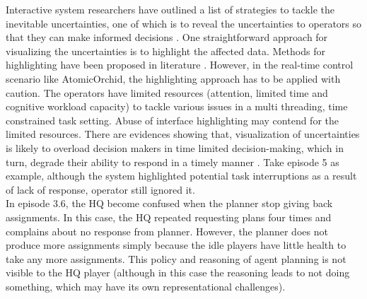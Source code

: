 Interactive system researchers have outlined a list of strategies to tackle the inevitable uncertainties, one of which is to reveal the uncertainties to operators so that they can make informed decisions \cite{Benford2006} \cite{Skeels2008}. One straightforward approach for visualizing the uncertainties is to highlight the affected data. Methods for highlighting have been proposed in literature \cite{Conti2006}. However, in the real-time control scenario like AtomicOrchid, the highlighting approach has to be applied with caution.  The operators have limited resources (attention, limited time and cognitive workload capacity) to tackle various issues in a multi threading, time constrained task setting. Abuse of interface highlighting may contend for the limited resources. There are evidences showing that, visualization of uncertainties is likely to overload decision makers in time limited decision-making, which in turn, degrade their ability to respond in a timely manner \cite{Zuk2007}. Take episode 5 as example, although the system highlighted potential task interruptions as a result of lack of response, operator still ignored it. \\

In episode 3.6, the HQ  become confused when the planner stop giving back assignments. In this case, the HQ repeated requesting plans four times and complains about no response from planner. However, the planner does not produce more assignments simply because the idle players have little health to take any more assignments. This policy and reasoning of agent planning is not visible to the HQ player (although in this case the reasoning leads to not doing something, which may have its own representational challenges). \\

